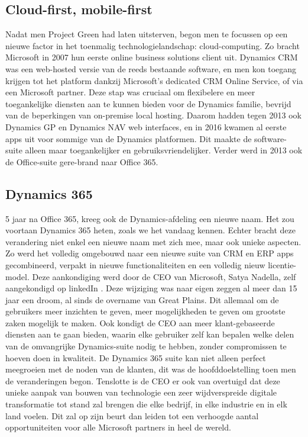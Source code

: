 \subsection{Cloud-first, mobile-first}
Nadat men Project Green had laten uitsterven, begon men te focussen op een nieuwe factor in het toenmalig technologielandschap: cloud-computing.  
Zo bracht Microsoft in 2007 hun eerste online business solutions client uit. Dynamics CRM was een web-hosted versie van de reeds bestaande software, en men kon toegang krijgen tot het platform dankzij Microsoft’s dedicated CRM Online Service, of via een Microsoft partner. Deze stap was cruciaal om flexibelere en meer toegankelijke diensten aan te kunnen bieden voor de Dynamics familie, bevrijd van de beperkingen van on-premise local hosting. 
Daarom hadden tegen 2013 ook Dynamics GP en Dynamics NAV web interfaces, en in 2016 kwamen al eerste apps uit voor sommige van de Dynamics platformen. Dit maakte de software-suite alleen maar toegankelijker en gebruiksvriendelijker. Verder werd in 2013 ook de Office-suite gere-brand naar Office 365.  


\subsection{Dynamics 365}
5 jaar na Office 365, kreeg ook de Dynamics-afdeling een nieuwe naam. Het zou voortaan Dynamics 365 heten, zoals we het vandaag kennen. Echter bracht deze verandering niet enkel een nieuwe naam met zich mee, maar ook unieke aspecten. Zo werd het volledig omgebouwd naar een nieuwe suite van CRM en ERP apps gecombineerd, verpakt in nieuwe functionaliteiten en een volledig nieuw licentie-model. 
Deze aankondiging werd door de CEO van Microsoft, Satya Nadella, zelf aangekondigd op linkedIn \textcite{Nadella2016}. Deze wijziging was naar eigen zeggen al meer dan 15 jaar een droom, al sinds de overname van Great Plains. Dit allemaal om de gebruikers meer inzichten te geven, meer mogelijkheden te geven om grootste zaken mogelijk te maken. Ook kondigt de CEO aan meer klant-gebaseerde diensten aan te gaan bieden, waarin elke gebruiker zelf kan bepalen welke delen van de omvangrijke Dynamics-suite nodig te hebben, zonder compromissen te hoeven doen in kwaliteit. De Dynamics 365 suite kan niet alleen perfect meegroeien met de noden van de klanten, dit was de hoofddoelstelling toen men de veranderingen begon. 
Tenslotte is de CEO er ook van overtuigd dat deze unieke aanpak van bouwen van technologie een zeer wijdverspreide digitale transformatie tot stand zal brengen die elke bedrijf, in elke industrie en in elk land voelen. Dit zal op zijn beurt dan leiden tot een verhoogde aantal opportuniteiten voor alle Microsoft partners in heel de wereld. 


